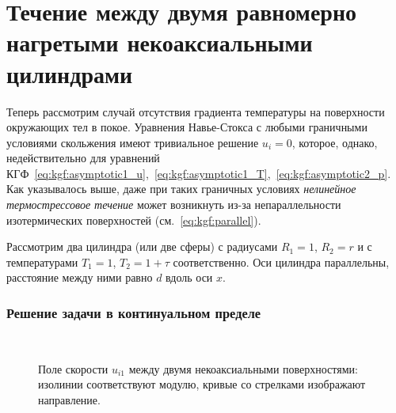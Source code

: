 \section{Течение между двумя равномерно нагретыми некоаксиальными цилиндрами} \label{sect:noncoaxial}

Теперь рассмотрим случай отсутствия градиента температуры на поверхности окружающих тел в покое.
Уравнения Навье-Стокса с любыми граничными условиями скольжения имеют тривиальное решение \(u_i = 0\), которое, однако,
недействительно для уравнений КГФ~\eqref{eq:kgf:asymptotic1_u},~\eqref{eq:kgf:asymptotic1_T},~\eqref{eq:kgf:asymptotic2_p}.
Как указывалось выше, даже при таких граничных условиях \emph{нелинейное термострессовое течение}
может возникнуть из-за непараллельности изотермических поверхностей (см.~\eqref{eq:kgf:parallel}).

Рассмотрим два цилиндра (или две сферы) с радиусами \(R_1 = 1\), \(R_2 = r\)
и с температурами \(T_1 = 1\), \(T_2 = 1+\tau\) соответственно.
Оси цилиндра параллельны, расстояние между ними равно \(d\) вдоль оси \(x\).

\subsubsection{Решение задачи в континуальном пределе}

\begin{figure}
    \centering
    \\
    \caption{Поле скорости \(u_{i1}\) между двумя некоаксиальными поверхностями:
        изолинии соответствуют модулю, кривые со стрелками изображают направление.}
\end{figure}

\begin{figure}
    \\
    \label{fig:cylinders}
\end{figure}

